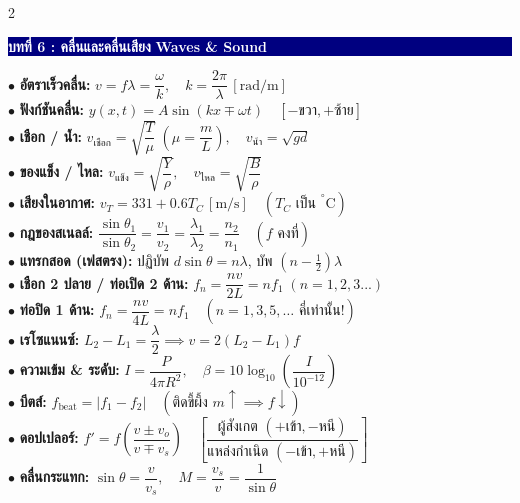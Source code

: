 \documentclass[10pt, a5paper]{article}
\newcommand{\boxheader}[2]{%
  \noindent\colorbox{navy}{\parbox{\dimexpr\linewidth-2\fboxsep}{%
    \textbf{\textcolor{white}{\small #1}} \hfill \textbf{\textcolor{white}{\scriptsize #2}}%
  }}\vspace{1.5pt}%
}
\begin{document}
\begin{multicols}{2}
\boxheader{บทที่ 6 : คลื่นและคลื่นเสียง}{Waves \& Sound}
\begin{tcolorbox}[colback=boxbg, colframe=navy, boxrule=0.6pt, arc=1.5pt, left=2.5pt, right=2.5pt, top=2.5pt, bottom=2.5pt]
{\fontsize{7.8}{9.5}\selectfont
$\bullet$ \textbf{อัตราเร็วคลื่น:} $v = f\lambda = \dfrac{\omega}{k}, \quad k = \dfrac{2\pi}{\lambda}\,\left[\text{rad/m}\right]$\\[1pt]
$\bullet$ \textbf{ฟังก์ชันคลื่น:} $y(x,t) = A\sin(kx \mp \omega t) \quad [-\text{ขวา}, +\text{ซ้าย}]$\\[1pt]
$\bullet$ \textbf{เชือก / น้ำ:} $v_{\text{เชือก}} = \sqrt{\dfrac{T}{\mu}} \; \left(\mu = \dfrac{m}{L}\right), \quad v_{\text{น้ำ}} = \sqrt{gd}$\\[1pt]
$\bullet$ \textbf{ของแข็ง / ไหล:} $v_{\text{แข็ง}} = \sqrt{\dfrac{Y}{\rho}}, \quad v_{\text{ไหล}} = \sqrt{\dfrac{B}{\rho}}$\\[1pt]
$\bullet$ \textbf{เสียงในอากาศ:} $v_T = 331 + 0.6T_C\,\left[\text{m/s}\right] \quad (T_C \text{ เป็น } ^\circ\text{C})$\\[1pt]
$\bullet$ \textbf{กฎของสเนลล์:} $\dfrac{\sin\theta_1}{\sin\theta_2} = \dfrac{v_1}{v_2} = \dfrac{\lambda_1}{\lambda_2} = \dfrac{n_2}{n_1} \quad (f \text{ คงที่})$\\[1pt]
$\bullet$ \textbf{แทรกสอด (เฟสตรง):} ปฏิบัพ $d\sin\theta = n\lambda$, บัพ $(n-\frac{1}{2})\lambda$\\[1pt]
$\bullet$ \textbf{เชือก 2 ปลาย / ท่อเปิด 2 ด้าน:} $f_n = \dfrac{nv}{2L} = n f_1 \; (n=1,2,3...)$\\[1pt]
$\bullet$ \textbf{ท่อปิด 1 ด้าน:} $f_n = \dfrac{nv}{4L} = n f_1 \quad (n = 1, 3, 5, \dots \textbf{ คี่เท่านั้น!})$\\[1pt]
$\bullet$ \textbf{เรโซแนนซ์:} $L_2 - L_1 = \dfrac{\lambda}{2} \implies v = 2(L_2 - L_1)f$\\[1pt]
$\bullet$ \textbf{ความเข้ม \& ระดับ:} $I = \dfrac{P}{4\pi R^2}, \quad \beta = 10\log_{10}\left(\dfrac{I}{10^{-12}}\right)$\\[1pt]
$\bullet$ \textbf{บีตส์:} $f_{\text{beat}} = |f_1 - f_2| \quad (\text{ติดขี้ผึ้ง } m \uparrow \implies f \downarrow)$\\[1pt]
$\bullet$ \textbf{ดอปเปลอร์:} $f' = f\left(\dfrac{v \pm v_o}{v \mp v_s}\right) \quad \left[\dfrac{\text{ผู้สังเกต } (+ \text{เข้า}, - \text{หนี})}{\text{แหล่งกำเนิด } (- \text{เข้า}, + \text{หนี})}\right]$\\[1pt]
$\bullet$ \textbf{คลื่นกระแทก:} $\sin\theta = \dfrac{v}{v_s}, \quad M = \dfrac{v_s}{v} = \dfrac{1}{\sin\theta}$
}
\end{tcolorbox}

\end{multicols}
\vspace{-2pt}
\end{document}
